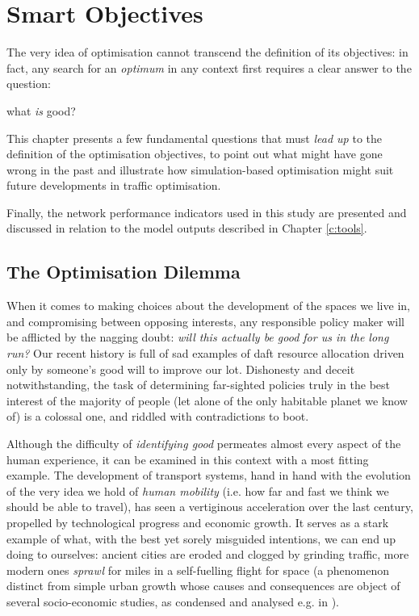 \chapter{Smart Objectives} \label{c:objectives}
The very idea of optimisation cannot transcend the definition of its objectives: in fact, any search for an \emph{optimum} in any context first requires a clear answer to the question:
\begin{center}
what \emph{ is } good?
\end{center}

This chapter presents a few fundamental questions that must \emph{lead up} to the definition of the optimisation objectives, to point out what might have gone wrong in the past and illustrate how simulation-based optimisation might suit future developments in traffic optimisation.

Finally, the network performance indicators used in this study are presented and discussed in relation to the model outputs described in Chapter \ref{c:tools}.

\section{The Optimisation Dilemma}
When it comes to making choices about the development of the spaces we live in, and compromising between opposing interests, any responsible policy maker will be afflicted by the nagging doubt: \emph{will this actually be good for us in the long run?} Our recent history is full of sad examples of daft resource allocation driven only by someone's good will to improve our lot.
Dishonesty and deceit notwithstanding, the task of determining far-sighted policies truly in the best interest of the majority of people (let alone of the only habitable planet we know of) is a colossal one, and riddled with contradictions to boot.

Although the difficulty of \emph{identifying good} permeates almost every aspect of the human experience, it can be examined in this context with a most fitting example. The development of transport systems, hand in hand with the evolution of the very idea we hold of \emph{human mobility} (i.e. how far and fast we think we should be able to travel), has seen a vertiginous acceleration over the last century, propelled by technological progress and economic growth. It serves as a stark example of what, with the best yet sorely misguided intentions, we can end up doing to ourselves: ancient cities are eroded and clogged by grinding traffic, more modern ones \emph{sprawl} for miles in a self-fuelling flight for space (a phenomenon distinct from simple urban growth whose causes and consequences are object of several socio-economic studies, as condensed and analysed e.g. in \citep{brueckner2000urban}).

